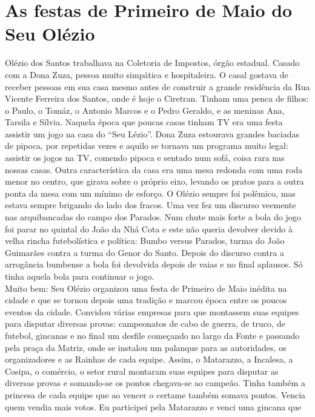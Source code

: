 \documentclass[12pt,brazil,]{book}
\begin{document}
\section{As festas de Primeiro de Maio do Seu
Olézio}\label{as-festas-de-primeiro-de-maio-do-seu-oluxe9zio}

Olézio dos Santos trabalhava na Coletoria de Impostos, órgão estadual.
Casado com a Dona Zuza, pessoa muito simpática e hospitaleira. O casal
gostava de receber pessoas em sua casa mesmo antes de construir a grande
residência da Rua Vicente Ferreira dos Santos, onde é hoje o Ciretran.
Tinham uma penca de filhos: o Paulo, o Tomáz, o Antonio Marcos e o Pedro
Geraldo, e as meninas Ana, Tarsila e Sílvia. Naquela época que poucas
casas tinham TV era uma festa assistir um jogo na casa do ``Seu Lézio''.
Dona Zuza estourava grandes baciadas de pipoca, por repetidas vezes e
aquilo se tornava um programa muito legal: assistir os jogos na TV,
comendo pipoca e sentado num sofá, coisa rara nas nossas casas. Outra
característica da casa era uma mesa redonda com uma roda menor no
centro, que girava sobre o próprio eixo, levando os pratos para a outra
ponta da mesa com um mínimo de esforço. O Olézio sempre foi polêmico,
mas estava sempre brigando do lado dos fracos. Uma vez fez um discurso
veemente nas arquibancadas do campo dos Parados. Num chute mais forte a
bola do jogo foi parar no quintal do João da Nhá Cota e este não queria
devolver devido à velha rincha futebolística e política: Bumbo versus
Parados, turma do João Guimarães contra a turma do Genor do Santo.
Depois do discurso contra a arrogância bumbense a bola foi devolvida
depois de vaias e no final aplausos. Só tinha aquela bola para continuar
o jogo.\\
Muito bem: Seu Olézio organizou uma festa de Primeiro de Maio inédita na
cidade e que se tornou depois uma tradição e marcou época entre os
poucos eventos da cidade. Convidou várias empresas para que montassem
suas equipes para disputar diversas provas: campeonatos de cabo de
guerra, de truco, de futebol, gincanas e no final um desfile começando
no largo da Fonte e passando pela praça da Matriz, onde se instalou um
palanque para as autoridades, os organizadores e as Rainhas de cada
equipe. Assim, o Matarazzo, a Incalesa, a Cosipa, o comércio, o setor
rural montaram suas equipes para disputar as diversas provas e
somando-se os pontos chegava-se ao campeão. Tinha também a princesa de
cada equipe que ao vencer o certame também somava pontos. Vencia quem
vendia mais votos. Eu participei pela Matarazzo e venci uma gincana que
\end{document}
